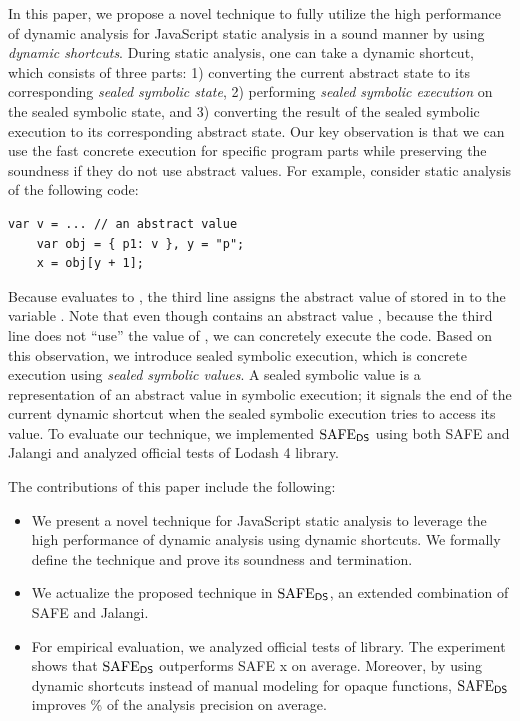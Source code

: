 In this paper, we propose a novel technique to fully utilize
the high performance of dynamic analysis for JavaScript static
analysis in a sound manner by using \textit{dynamic shortcuts}.
During static analysis, one can take a dynamic shortcut, which
consists of three parts: 1) converting the current abstract state to
its corresponding \textit{sealed symbolic state}, 2) performing
\textit{sealed symbolic execution} on the sealed symbolic state, and
3) converting the result of the sealed symbolic execution to its
corresponding abstract state.  Our key observation is that we can use
the fast concrete execution for specific program parts while
preserving the soundness if they do not use abstract values.
For example, consider static analysis of the following code:
\begin{lstlisting}[style=myJSstyle,numbers=none]
    var v = ... // an abstract value
    var obj = { p1: v }, y = "p";
    x = obj[y + 1];
\end{lstlisting}
Because  evaluates to ,
the third line assigns the abstract value of  stored in
 to the variable .
Note that even though  contains an abstract value ,
because the third line does not ``use'' the value of ,
we can concretely execute the code.  Based on this observation,
we introduce sealed symbolic execution, which is concrete execution
using \textit{sealed symbolic values}.  A sealed symbolic value is a
representation of an abstract value in symbolic execution; it signals
the end of the current dynamic shortcut when the sealed symbolic
execution tries to access its value.
To evaluate our technique, we implemented $\text{SAFE}_{\textsf{DS}}$ using both SAFE
and Jalangi and analyzed  official tests of Lodash 4 library.

The contributions of this paper include the following:
\begin{itemize}
\item We present a novel technique for JavaScript static
analysis to leverage the high performance of dynamic analysis using
dynamic shortcuts.  We formally define the technique and prove
its soundness and termination.
\item We actualize the proposed technique in $\text{SAFE}_{\textsf{DS}}$, an
extended combination of SAFE and Jalangi.
\item For empirical evaluation, we analyzed  official tests of
 library.  The experiment shows that $\text{SAFE}_{\textsf{DS}}$ outperforms
SAFE x on average.  Moreover, by using dynamic shortcuts
instead of manual modeling for  opaque functions,
$\text{SAFE}_{\textsf{DS}}$ improves \% of the analysis precision on average.
\end{itemize}

